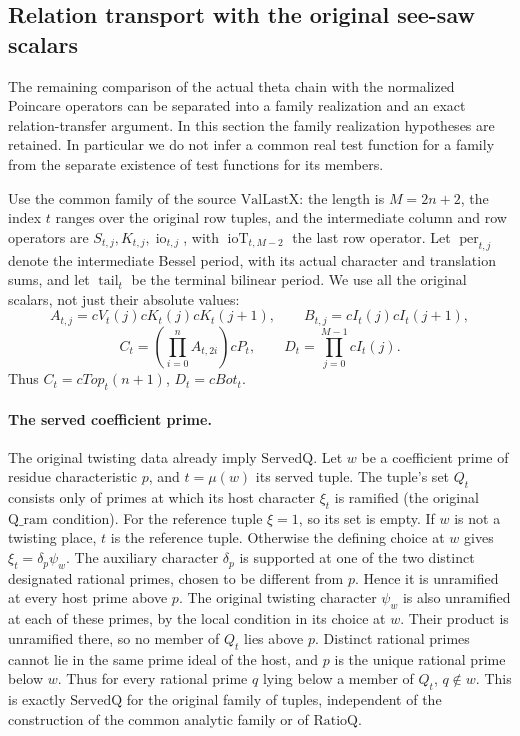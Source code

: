 \subsection{Relation transport with the original see-saw scalars}
\label{sec:theta-relation-transport}

The remaining comparison of the actual theta chain with the normalized
Poincare operators can be separated into a family realization and an
exact relation-transfer argument. In this section the family
realization hypotheses are retained. In particular we do not infer a
common real test function for a family from the separate existence of
test functions for its members.

Use the common family of the source \(\mathrm{ValLastX}\):
the length is \(M=2n+2\), the index \(t\) ranges over the original row
tuples, and the intermediate column and row operators are
\(S_{t,j},K_{t,j},\operatorname{io}_{t,j}\), with
\(\operatorname{ioT}_{t,M-2}\) the last row operator.
Let \(\operatorname{per}_{t,j}\) denote the intermediate Bessel
period, with its actual character and translation sums, and let
\(\operatorname{tail}_t\) be the terminal bilinear period.
We use all the original scalars, not just their absolute values:
\[
 A_{t,j}=cV_t(j)cK_t(j)cK_t(j+1),\qquad
 B_{t,j}=cI_t(j)cI_t(j+1),
\]
\[
 C_t=\left(\prod_{i=0}^{n}A_{t,2i}\right)cP_t,\qquad
 D_t=\prod_{j=0}^{M-1}cI_t(j).
 \tag{RT1}
\]
Thus \(C_t=cTop_t(n+1)\), \(D_t=cBot_t\).


\paragraph{The served coefficient prime.}
\label{par:theta-served-prime}
The original twisting data already imply \(\mathrm{ServedQ}\).
Let \(w\) be a coefficient prime of residue characteristic
\(p\), and \(t=\mu(w)\) its served tuple. The tuple's set
\(Q_t\) consists only of primes at which its host character
\(\xi_t\) is ramified (the original \(\mathrm{Q\_ram}\)
condition). For the reference tuple \(\xi=1\), so its set
is empty. If \(w\) is not a twisting place, \(t\) is the
reference tuple. Otherwise the defining choice at \(w\)
gives \(\xi_t=\delta_p\psi_w\). The auxiliary character
\(\delta_p\) is supported at one of the two distinct
designated rational primes, chosen to be different from
\(p\). Hence it is unramified at every host prime above
\(p\). The original twisting character \(\psi_w\) is also
unramified at each of these primes, by the local condition
in its choice at \(w\). Their product is unramified
there, so no member of \(Q_t\) lies above \(p\).
Distinct rational primes cannot lie in the same prime
ideal of the host, and \(p\) is the unique rational
prime below \(w\). Thus for every rational prime
\(q\) lying below a member of \(Q_t\), \(q\notin w\).
This is exactly \(\mathrm{ServedQ}\) for the original
family of tuples, independent of the construction of
the common analytic family or of \(\mathrm{RatioQ}\).

